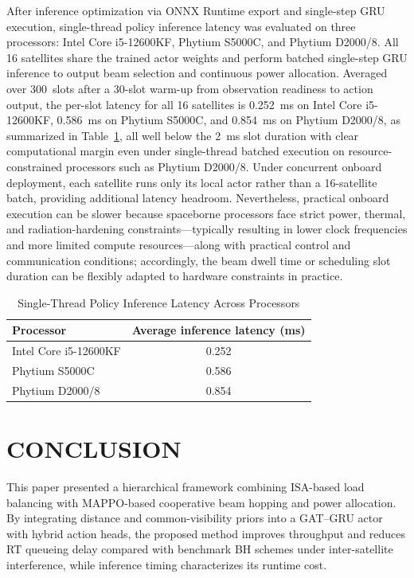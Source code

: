 \documentclass[journal]{IEEEtran}
\begin{document}
After inference optimization via ONNX Runtime export and single-step GRU execution, single-thread policy inference latency was evaluated on three processors: Intel Core i5-12600KF, Phytium S5000C, and Phytium D2000/8. All 16 satellites share the trained actor weights and perform batched single-step GRU inference to output beam selection and continuous power allocation. Averaged over 300~slots after a 30-slot warm-up from observation readiness to action output, the per-slot latency for all 16 satellites is 0.252~ms on Intel Core i5-12600KF, 0.586~ms on Phytium S5000C, and 0.854~ms on Phytium D2000/8, as summarized in Table~\ref{tab:inference-latency}, all well below the 2~ms slot duration with clear computational margin even under single-thread batched execution on resource-constrained processors such as Phytium D2000/8. Under concurrent onboard deployment, each satellite runs only its local actor rather than a 16-satellite batch, providing additional latency headroom. Nevertheless, practical onboard execution can be slower because spaceborne processors face strict power, thermal, and radiation-hardening constraints---typically resulting in lower clock frequencies and more limited compute resources---along with practical control and communication conditions; accordingly, the beam dwell time or scheduling slot duration can be flexibly adapted to hardware constraints in practice.

\begin{table}[t]
\centering
\caption{Single-Thread Policy Inference Latency Across Processors}
\label{tab:inference-latency}
\renewcommand{\arraystretch}{1.12}
\setlength{\tabcolsep}{8pt}
\footnotesize
\begin{tabular}{lc}
\hline
Processor & Average inference latency (ms) \\
\hline
Intel Core i5-12600KF & 0.252 \\
Phytium S5000C & 0.586 \\
Phytium D2000/8 & 0.854 \\
\hline
\end{tabular}
\end{table}

\section{CONCLUSION}
\label{sec:conclusion}
This paper presented a hierarchical framework combining ISA-based load balancing with MAPPO-based cooperative beam hopping and power allocation. By integrating distance and common-visibility priors into a GAT--GRU actor with hybrid action heads, the proposed method improves throughput and reduces RT queueing delay compared with benchmark BH schemes under inter-satellite interference, while inference timing characterizes its runtime cost.
\end{document}

